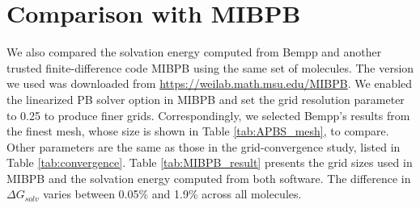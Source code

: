{\begin{table}[]
    \centering
    \caption{Mesh sizes of the molecules used in the convergence study of APBS and Bempp.}
    \label{tab:APBS_mesh}
\end{table}

\section{Comparison with MIBPB}\label{sec:comp_mibpb}
We also compared the solvation energy computed from Bempp and another trusted finite-difference code MIBPB using the same set of molecules.
The version we used was downloaded from \href{https://weilab.math.msu.edu/MIBPB}{https://weilab.math.msu.edu/MIBPB}.
We enabled the linearized PB solver option in MIBPB and set the grid resolution parameter to 0.25 to produce finer grids.
Correspondingly, we selected Bempp's results from the finest mesh, whose size is shown in Table \ref{tab:APBS_mesh}, to compare.
Other parameters are the same as those in the grid-convergence study, listed in Table \ref{tab:convergence}.
Table \ref{tab:MIBPB_result} presents the grid sizes used in MIBPB and the solvation energy computed from both software.
The difference in $\Delta G_{solv}$ varies between 0.05\% and 1.9\% across all molecules.

}
